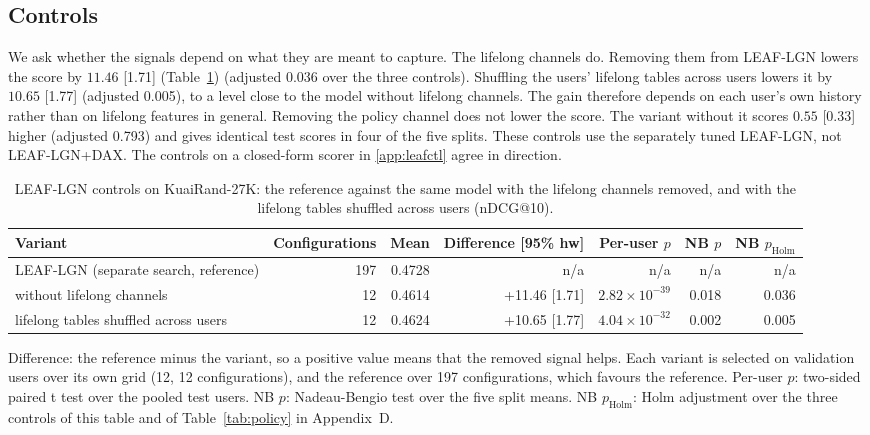\documentclass[preprint,12pt,authoryear]{elsarticle}
\begin{document}
\subsection{Controls}
\label{sec:res-controls}

We ask whether the signals depend on what they are meant to capture. The lifelong channels do. Removing them from LEAF-LGN lowers the score by $11.46$ [1.71] (Table~\ref{tab:leafctl-lgn})
(adjusted 0.036 over the three controls). Shuffling the users' lifelong tables across users lowers it by $10.65$ [1.77] (adjusted 0.005), to a level
close to the model without lifelong channels. The gain therefore depends on each user's own history rather than on lifelong features in general.
Removing the policy channel does not lower the score. The variant without it scores $0.55$ [0.33] higher (adjusted 0.793) and gives identical test scores in four of the five splits. These controls use the separately tuned LEAF-LGN, not LEAF-LGN+DAX. The controls on a closed-form scorer in \ref{app:leafctl} agree
in direction.

\begin{table}[tbp]
\centering
\footnotesize
\caption{LEAF-LGN controls on KuaiRand-27K: the reference against the same model with the lifelong channels removed, and with the lifelong tables shuffled across users (nDCG@10).}
\label{tab:leafctl-lgn}
\begin{adjustbox}{max width=\linewidth}
\begin{tabular}{lrrrrrr}
\toprule
Variant & Configurations & Mean & Difference [95\% hw] & Per-user $p$ & NB $p$ & NB $p_{\mathrm{Holm}}$ \\
\midrule
LEAF-LGN (separate search, reference) & 197 & 0.4728 & n/a & n/a & n/a & n/a \\
\midrule
without lifelong channels & 12 & 0.4614 & +11.46 [1.71] & $2.82\times10^{-39}$ & 0.018 & 0.036 \\
lifelong tables shuffled across users & 12 & 0.4624 & +10.65 [1.77] & $4.04\times10^{-32}$ & 0.002 & 0.005 \\
\bottomrule
\end{tabular}
\end{adjustbox}
\par\smallskip
\begin{minipage}{\linewidth}\raggedright\footnotesize Difference: the reference minus the variant, so a positive value means that the removed signal helps. Each variant is selected on validation users over its own grid (12, 12 configurations), and the reference over 197 configurations, which favours the reference. Per-user $p$: two-sided paired t test over the pooled test users. NB $p$: Nadeau-Bengio test over the five split means. NB $p_{\mathrm{Holm}}$: Holm adjustment over the three controls of this table and of Table~\ref{tab:policy} in Appendix~D.\end{minipage}
\end{table}
\end{document}
